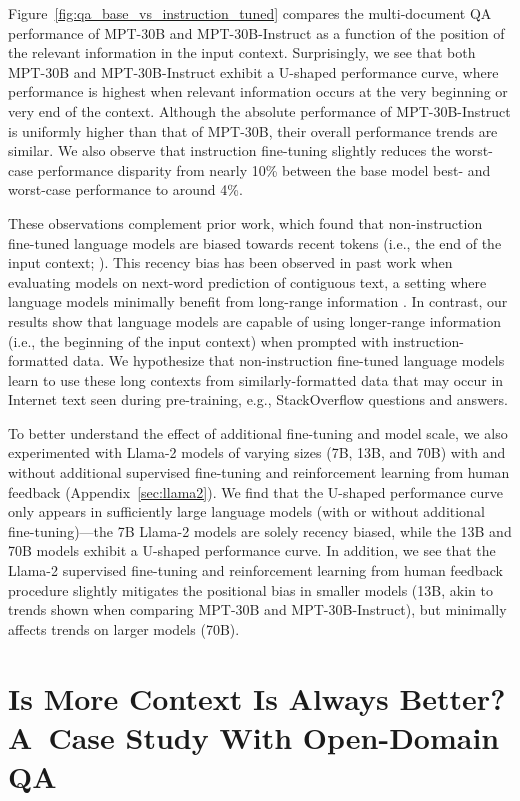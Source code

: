 Figure~\ref{fig:qa_base_vs_instruction_tuned} compares the multi-document QA performance of MPT-30B and MPT-30B-Instruct as a function of the position of the relevant information in the input context. Surprisingly, we see that both MPT-30B and MPT-30B-Instruct exhibit a U-shaped performance curve, where performance is highest when relevant information occurs at the very beginning or very end of the context. Although the absolute performance of MPT-30B-Instruct is uniformly higher than that of MPT-30B, their overall performance trends are similar. We also observe that instruction fine-tuning slightly reduces the worst-case performance disparity from nearly 10\% between the base model best- and worst-case performance to around 4\%.

These observations complement prior work, which found that non-instruction fine-tuned language models are biased towards recent tokens (i.e., the end of the input context; \citealp{khandelwal-etal-2018-sharp,press-etal-2021-shortformer}).
This recency bias has been observed in past work when evaluating models on next-word prediction of contiguous text, a setting where language models minimally benefit from long-range information \citep{sun-etal-2021-long}. In contrast, our results show that language models are capable of using longer-range information (i.e., the beginning of the input context) when prompted with instruction-formatted data. We hypothesize that non-instruction fine-tuned language models learn to use these long contexts from similarly-formatted data that may occur in Internet text seen during pre-training, e.g., StackOverflow questions and answers.

To better understand the effect of additional fine-tuning and model scale, we also experimented with Llama-2 models of varying sizes (7B, 13B, and 70B) with and without additional supervised fine-tuning and reinforcement learning from human feedback (Appendix~\ref{sec:llama2}). We find that the U-shaped performance curve only appears in sufficiently large language models (with or without additional fine-tuning)---the 7B Llama-2 models are solely recency biased, while the 13B and 70B models exhibit a U-shaped performance curve. In addition, we see that the Llama-2 supervised fine-tuning and reinforcement learning from human feedback procedure slightly mitigates the positional bias in smaller models (13B, akin to trends shown when comparing MPT-30B and MPT-30B-Instruct), but minimally affects trends on larger models (70B).

\section{Is More Context Is Always Better? A~Case Study With Open-Domain QA}\label{sec:odqa_case_study}

